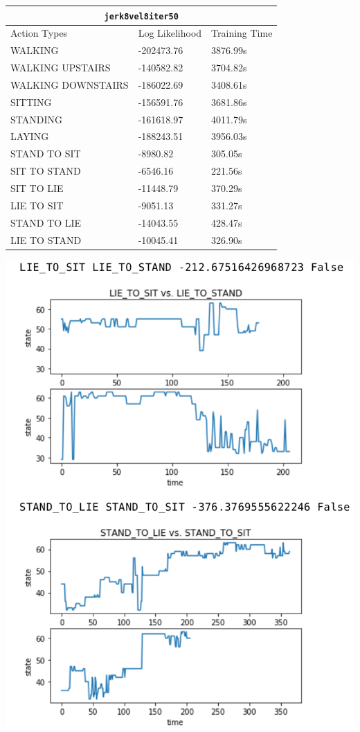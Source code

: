 \documentclass[10pt,twocolumn,letterpaper]{article}
\begin{document}
{\centering
\begin{tabular}{ p{4cm}  p{2.3cm}  p{2cm} }
 \hline
 \multicolumn{3}{c}{\texttt{jerk8vel8iter50}} \\
 \hline
 \centering
 Action Types & Log Likelihood & Training Time \\
 \hline
 WALKING &   -202473.76  & 3876.99s \\
 WALKING UPSTAIRS & -140582.82 & 3704.82s \\
 WALKING DOWNSTAIRS & -186022.69 & 3408.61s \\
 SITTING & -156591.76 & 3681.86s \\
 STANDING & -161618.97 & 4011.79s \\
 LAYING & -188243.51 & 3956.03s \\
 STAND TO SIT & -8980.82 & 305.05s \\
 SIT TO STAND & -6546.16 & 221.56s \\
 SIT TO LIE & -11448.79 & 370.29s \\
 LIE TO SIT & -9051.13 & 331.27s \\
 STAND TO LIE & -14043.55 & 428.47s \\
 LIE TO STAND & -10045.41 & 326.90s \\
 \hline
\end{tabular}

\begin{center}
\includegraphics[width=1\linewidth]{./Wrong.png}
\end{center}
}
\end{document}
